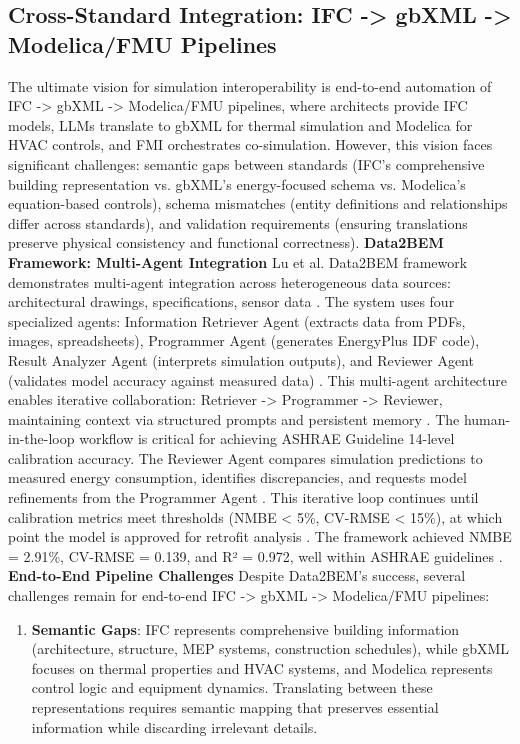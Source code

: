 \documentclass[12pt,a4paper]{article}
\begin{document}
\subsection{Cross-Standard Integration: IFC -> gbXML -> Modelica/FMU Pipelines}
The ultimate vision for simulation interoperability is end-to-end automation of IFC -> gbXML -> Modelica/FMU pipelines, where architects provide IFC models, LLMs translate to gbXML for thermal simulation and Modelica for HVAC controls, and FMI orchestrates co-simulation. However, this vision faces significant challenges: semantic gaps between standards (IFC's comprehensive building representation vs. gbXML's energy-focused schema vs. Modelica's equation-based controls), schema mismatches (entity definitions and relationships differ across standards), and validation requirements (ensuring translations preserve physical consistency and functional correctness).
\textbf{Data2BEM Framework: Multi-Agent Integration}
Lu et al. Data2BEM framework demonstrates multi-agent integration across heterogeneous data sources: architectural drawings, specifications, sensor data \cite{ref36}. The system uses four specialized agents: Information Retriever Agent (extracts data from PDFs, images, spreadsheets), Programmer Agent (generates EnergyPlus IDF code), Result Analyzer Agent (interprets simulation outputs), and Reviewer Agent (validates model accuracy against measured data) \cite{ref36}. This multi-agent architecture enables iterative collaboration: Retriever -> Programmer -> Reviewer, maintaining context via structured prompts and persistent memory \cite{ref36}.
The human-in-the-loop workflow is critical for achieving ASHRAE Guideline 14-level calibration accuracy. The Reviewer Agent compares simulation predictions to measured energy consumption, identifies discrepancies, and requests model refinements from the Programmer Agent \cite{ref36}. This iterative loop continues until calibration metrics meet thresholds (NMBE < 5\%, CV-RMSE < 15\%), at which point the model is approved for retrofit analysis \cite{ref36}. The framework achieved NMBE = 2.91\%, CV-RMSE = 0.139, and R² = 0.972, well within ASHRAE guidelines \cite{ref36}.
\textbf{End-to-End Pipeline Challenges}
Despite Data2BEM's success, several challenges remain for end-to-end IFC -> gbXML -> Modelica/FMU pipelines:
\begin{enumerate}
  \item \textbf{Semantic Gaps}: IFC represents comprehensive building information (architecture, structure, MEP systems, construction schedules), while gbXML focuses on thermal properties and HVAC systems, and Modelica represents control logic and equipment dynamics. Translating between these representations requires semantic mapping that preserves essential information while discarding irrelevant details.
\end{enumerate}
\end{document}
